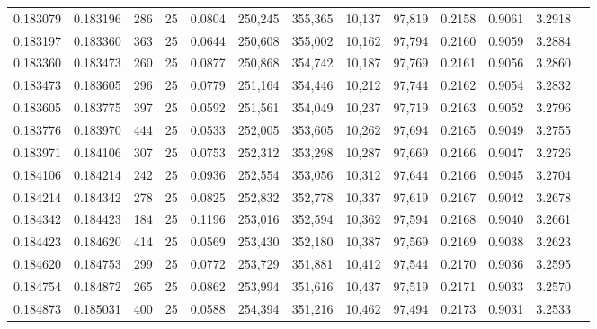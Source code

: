 \begin{tabular}{rrrrrrrrrrrrr}
0.183079 & 0.183196 &   286 &  25 &                                     0.0804 & 250,245 & 355,365 &  10,137 &  97,819 & 0.2158 & 0.9061 & 3.2918 \\
0.183197 & 0.183360 &   363 &  25 &                                     0.0644 & 250,608 & 355,002 &  10,162 &  97,794 & 0.2160 & 0.9059 & 3.2884 \\
0.183360 & 0.183473 &   260 &  25 &                                     0.0877 & 250,868 & 354,742 &  10,187 &  97,769 & 0.2161 & 0.9056 & 3.2860 \\
0.183473 & 0.183605 &   296 &  25 &                                     0.0779 & 251,164 & 354,446 &  10,212 &  97,744 & 0.2162 & 0.9054 & 3.2832 \\
0.183605 & 0.183775 &   397 &  25 &                                     0.0592 & 251,561 & 354,049 &  10,237 &  97,719 & 0.2163 & 0.9052 & 3.2796 \\
0.183776 & 0.183970 &   444 &  25 &                                     0.0533 & 252,005 & 353,605 &  10,262 &  97,694 & 0.2165 & 0.9049 & 3.2755 \\
0.183971 & 0.184106 &   307 &  25 &                                     0.0753 & 252,312 & 353,298 &  10,287 &  97,669 & 0.2166 & 0.9047 & 3.2726 \\
0.184106 & 0.184214 &   242 &  25 &                                     0.0936 & 252,554 & 353,056 &  10,312 &  97,644 & 0.2166 & 0.9045 & 3.2704 \\
0.184214 & 0.184342 &   278 &  25 &                                     0.0825 & 252,832 & 352,778 &  10,337 &  97,619 & 0.2167 & 0.9042 & 3.2678 \\
0.184342 & 0.184423 &   184 &  25 &                                     0.1196 & 253,016 & 352,594 &  10,362 &  97,594 & 0.2168 & 0.9040 & 3.2661 \\
0.184423 & 0.184620 &   414 &  25 &                                     0.0569 & 253,430 & 352,180 &  10,387 &  97,569 & 0.2169 & 0.9038 & 3.2623 \\
0.184620 & 0.184753 &   299 &  25 &                                     0.0772 & 253,729 & 351,881 &  10,412 &  97,544 & 0.2170 & 0.9036 & 3.2595 \\
0.184754 & 0.184872 &   265 &  25 &                                     0.0862 & 253,994 & 351,616 &  10,437 &  97,519 & 0.2171 & 0.9033 & 3.2570 \\
0.184873 & 0.185031 &   400 &  25 &                                     0.0588 & 254,394 & 351,216 &  10,462 &  97,494 & 0.2173 & 0.9031 & 3.2533 \\

\end{tabular}
